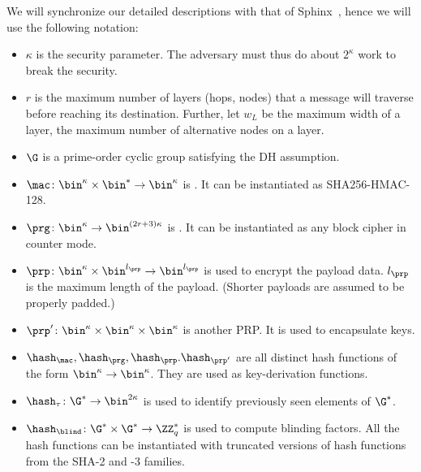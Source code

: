 We will synchronize our detailed descriptions with that of 
Sphinx~\cite{Sphinx}, hence we will use the following notation:
\begin{itemize}
  \item \(\kappa\) is the security parameter.
    The adversary must thus do about \(2^\kappa\) work to break the security.

  \item \(r\) is the maximum number of layers (hops, nodes) that a message will 
    traverse before reaching its destination.
    Further, let \(w_L\) be the maximum width of a layer, \ie the maximum 
    number of alternative nodes on a layer.

  \item \(\G\) is a prime-order cyclic group satisfying the \ac{DH} assumption.

  \item \(\mac\colon \bin^\kappa\times \bin^*\to \bin^\kappa\) is .
    It can be instantiated as \eg SHA256-HMAC-128.

  \item \(\prg\colon \bin^\kappa\to \bin^{(2r+3)\kappa}\) is .
    It can be instantiated as any block cipher in counter mode.

  \item \(\prp\colon \bin^\kappa\times \bin^{l_\prp} \to \bin^{l_\prp}\) is 
     used to encrypt the payload data.
    \(l_\prp\) is the maximum length of the payload.
    (Shorter payloads are assumed to be properly padded.)

  \item \(\prp'\colon \bin^\kappa\times \bin^\kappa\times \bin^\kappa\) is 
    another \ac{PRP}.
    It is used to encapsulate keys.

  \item \(\hash_\mac, \hash_\prg, \hash_\prp. \hash_{\prp'}\) are all distinct 
    hash functions of the form \(\bin^\kappa\to \bin^\kappa\).
    They are used as key-derivation functions.

  \item \(\hash_\tau\colon \G^*\to \bin^{2\kappa}\) is used to identify 
    previously seen elements of \(\G^*\).

  \item \(\hash_\blind\colon \G^*\times \G^*\to \ZZ_q^*\) is used to compute 
    blinding factors.
    All the hash functions can be instantiated with truncated versions of hash 
    functions from the SHA-2 and -3 families.


\end{itemize}
